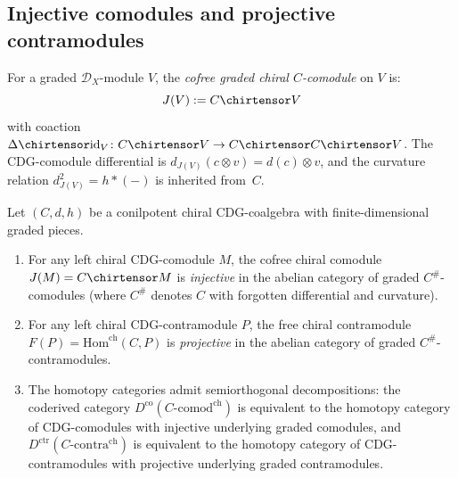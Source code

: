 \subsection{Injective comodules and projective contramodules}
\label{subsec:chiral-inj-proj}

\begin{definition}
\label{def:cofree-chiral-comod}
For a graded $\mathcal{D}_X$-module $V$, the \emph{cofree graded
chiral $C$-comodule} on $V$ is:
\[
J(V) := C \chirtensor V
\]
with coaction $\Delta \chirtensor \mathrm{id}_V\colon
C \chirtensor V \to C \chirtensor C \chirtensor V$.
The CDG-comodule differential is
$d_{J(V)}(c \otimes v) = d(c) \otimes v$,
and the curvature relation $d_{J(V)}^2 = h \ast (-)$ is inherited
from~$C$.
\end{definition}

\begin{proposition}\label{prop:chiral-inj-proj-resolutions}
Let $(C, d, h)$ be a conilpotent chiral CDG-coalgebra with
finite-dimensional graded pieces.
\begin{enumerate}[label=\textup{(\alph*)}]
\item For any left chiral CDG-comodule $M$, the cofree chiral
  comodule $J(M) = C \chirtensor M$ is \emph{injective} in the
  abelian category of graded $C^{\#}$-comodules (where $C^{\#}$
  denotes $C$ with forgotten differential and curvature).
\item For any left chiral CDG-contramodule $P$, the free chiral
  contramodule $F(P) = \mathrm{Hom}^{\mathrm{ch}}(C, P)$ is
  \emph{projective} in the abelian category of graded
  $C^{\#}$-contramodules.
\item The homotopy categories admit semiorthogonal decompositions:
  the coderived category $D^{\mathrm{co}}(C\text{-}\mathrm{comod}^{\mathrm{ch}})$
  is equivalent to the homotopy category of CDG-comodules
  with injective underlying graded comodules, and
  $D^{\mathrm{ctr}}(C\text{-}\mathrm{contra}^{\mathrm{ch}})$
  is equivalent to the homotopy category of CDG-contramodules
  with projective underlying graded contramodules.
\end{enumerate}
\end{proposition}

